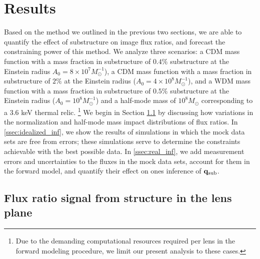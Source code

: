\section{Results}
\label{sec:results}

Based on the method we outlined in the previous two sections, we are able to quantify the effect of substructure on image flux ratios, and forecast the constraining power of this method. We analyze three scenarios: a CDM mass function with a mass fraction in substructure of $0.4\%$ substructure at the Einstein radius $A_0 = 8 \times 10^7 M_{\odot}^{-1}$), a CDM mass function with a mass fraction in substructure of $2\%$ at the Einstein radius ($A_0 = 4 \times 10^8 M_{\odot}^{-1}$), and a WDM mass function with a mass fraction in substructure of $0.5\%$ substructure at the Einstein radius ($A_0 = 10^8 M_{\odot}^{-1}$) and a half-mode mass of $10^8 M_{\odot}$ corresponding to a 3.6 keV thermal relic. \footnote{Due to the demanding computational resources required per lens in the forward modeling procedure, we limit our present analysis to these cases.} We begin in Section \ref{ssec:signal} by discussing how variations in the normalization and half-mode mass impact distributions of flux ratios. In \ref{ssec:idealized_inf}, we show the results of simulations in which the mock data sets are free from errors; these simulations serve to determine the constraints achievable with the best possible data. In \ref{ssec:real_inf}, we add measurement errors and uncertainties to the fluxes in the mock data sets, account for them in the forward model, and quantify their effect on ones inference of ${\bf{q}_{\rm{sub}}}$. 

\subsection{Flux ratio signal from structure in the lens plane}
\label{ssec:signal}

